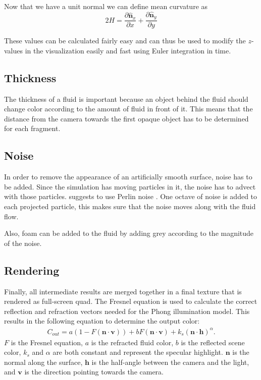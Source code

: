 Now that we have a unit normal we can define mean curvature as \[2H = \frac{\partial \hat{\mathbf{n}}_x}{\partial x} + \frac{\partial\hat{\mathbf{n}}_y}{\partial y}\]

These values can be calculated fairly easy and can thus be used to modify the \(z\)-values in the visualization easily and fast using Euler integration in time.

\subsection{Thickness}
The thickness of a fluid is important because an object behind the fluid should change color according to the amount of fluid in front of it.
This means that the distance from the camera towards the first opaque object has to be determined for each fragment.

\subsection{Noise}
In order to remove the appearance of an artificially smooth surface, noise has to be added.
Since the simulation has moving particles in it, the noise has to advect with those particles.
\cite{van2009screen} suggests to use Perlin noise \cite{perlin1985image}.
One octave of noise is added to each projected particle, this makes sure that the noise moves along with the fluid flow.

Also, foam can be added to the fluid by adding grey according to the magnitude of the noise.

\subsection{Rendering}
Finally, all intermediate results are merged together in a final texture that is rendered as full-screen quad.
The Fresnel equation is used to calculate the correct reflection and refraction vectors needed for the Phong \cite{phong1975illumination} illumination model.
This results in the following equation \cite{van2009screen}to determine the output color:
\begin{eqnarray}
C_{out} = a(1 - F(\mathbf{n} \cdot \mathbf{v})) + bF(\mathbf{n} \cdot \mathbf{v}) + k_s(\mathbf{n} \cdot \mathbf{h})^\alpha.
\end{eqnarray}
$F$ is the Fresnel equation, $a$ is the refracted fluid color, $b$ is the reflected scene color, $k_s$ and $\alpha$ are both constant and represent the specular highlight. $\mathbf{n}$ is the normal along the surface, $\mathbf{h}$ is the half-angle between the camera and the light, and $\mathbf{v}$ is the direction pointing towards the camera.


